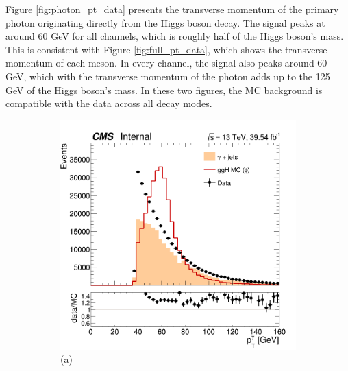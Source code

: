 \newpage

Figure \ref{fig:photon_pt_data} presents the transverse momentum of the primary photon originating directly from the Higgs boson decay. The signal peaks at around 60 GeV for all channels, which is roughly half of the Higgs boson's mass. This is consistent with Figure \ref{fig:full_pt_data}, which shows the transverse momentum of each meson. In every channel, the signal also peaks around 60 GeV, which with the transverse momentum of the photon adds up to the 125 GeV of the Higgs boson's mass. In these two figures, the MC background is compatible with the data across all decay modes.
\begin{figure}[!ht]
    \captionsetup[subfigure]{labelformat=empty}
    \vspace*{-0.2cm}
    \centering
    \setlength{\mylength}{\textwidth}
    \begin{subfigure}[t]{0.50\mylength}
        \centering
        \includegraphics[width=0.49\mylength]{resources/plots/Phi3_photon_pt.png}
        \vspace*{-0.2cm}
        \caption{\footnotesize (a)}
    \end{subfigure}%
    \begin{subfigure}[t]{0.50\mylength}
        \centering

\end{subfigure}
\end{figure}
